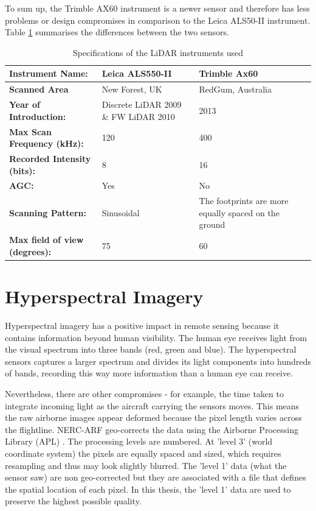 \documentclass{subfiles}
\begin{document}
	To sum up, the Trimble AX60 instrument is a newer sensor and therefore has less problems or design compromises in comparison to the Leica ALS50-II instrument. Table \ref{tab:InstrumentsSpecs} summarises the differences between the two sensors. 
	
	\begin{table}[!htbp]
		\label{tab:InstrumentsSpecs}%
		\centering
		\begin{tabular}{|l||m{}|m{}|}
			\hline
			\textbf{Instrument Name:}	& \textbf{Leica ALS550-II}     & \textbf{Trimble Ax60  }    \\
			\hline\hline
			\textbf{Scanned Area} & New Forest, UK & RedGum, Australia \\
			\hline
			\textbf{Year of Introduction: }&Discrete LiDAR 2009 \& FW LiDAR 2010& 2013  \\
			\hline
			\textbf{Max Scan Frequency (kHz):} & 120 & 400  \\
			\hline
			\textbf{Recorded Intensity (bits):} & 8 & 16 \\
			\hline
			\textbf{AGC:} & Yes & No \\
			\hline
			\textbf{Scanning Pattern:} & Sinusoidal  & The footprints are more equally spaced on the ground \\			
			\hline
			\textbf{Max field of view (degrees):} & 75 & 60	\\
			\hline
		\end{tabular}%
		\caption{Specifications of the LiDAR instruments used}
	\end{table}
	


	\section{Hyperspectral Imagery}\label{sec:HyperspectralImages}
	\par Hyperspectral imagery has a positive impact in remote sensing because it contains information beyond human visibility. The human eye receives light from the visual spectrum into three bands (red, green and blue). The hyperspectral sensors captures a larger spectrum and divides its light components into hundreds of bands, recording this way more information than a human eye can receive\cite{Smith2012}. 
	
	\par Nevertheless, there are other compromises - for example, the time taken to integrate incoming light as the aircraft carrying the sensors moves.  This means the raw airborne images appear deformed because the pixel length varies across the flightline. NERC-ARF geo-corrects the data using the Airborne Processing Library (APL) \cite{Warren2014}. The processing levels are numbered. At 'level 3' (world coordinate system) the pixels are equally spaced and sized, which requires resampling and thus may look slightly blurred. The 'level 1' data (what the sensor saw) are non geo-corrected but they are associated with a file that defines the spatial location of each pixel.  In this thesis, the 'level 1' data are used to preserve the highest possible quality.
\end{document}
